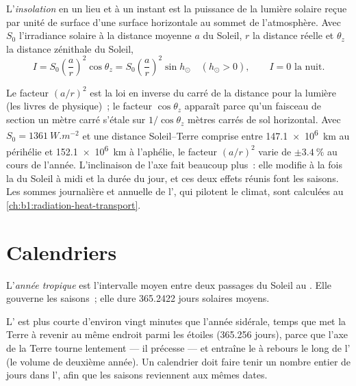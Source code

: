 \begin{definition}[Insolation]\label{def:b1:spherical-astronomy:insolation}
L'\emph{insolation} en un lieu et à un instant est la
puissance de la lumière solaire reçue par unité de surface d'une surface
horizontale au sommet de l'atmosphère. Avec $S_0$ l'irradiance solaire à la
distance moyenne $a$ du Soleil, $r$ la distance réelle et $\theta_z$ la
distance zénithale du Soleil,
\[
  I = S_0\left(\frac{a}{r}\right)^{2}\cos\theta_z = S_0\left(\frac{a}{r}\right)^{2}\sin h_\odot
  \quad (h_\odot > 0), \qquad I = 0 \text{ la nuit}.
\]
\end{definition}

Le facteur $(a/r)^2$ est la loi en inverse du carré de la distance pour la
lumière (les livres de physique)~; le facteur $\cos\theta_z$ apparaît parce
qu'un faisceau de section un mètre carré s'étale sur $1/\cos\theta_z$ mètres
carrés de sol horizontal. Avec
$S_0 = \qty{1361}{W.m^{-2}}$ et une distance Soleil--Terre comprise entre
\qty{147.1e6}{km} au périhélie et \qty{152.1e6}{km} à l'aphélie, le facteur
$(a/r)^2$ varie de $\pm\qty{3.4}{\percent}$ au cours de l'année. L'inclinaison
de l'axe fait beaucoup plus~: elle modifie à la fois la  du Soleil à
midi et la durée du jour, et ces deux effets réunis font les saisons. Les
sommes journalière et annuelle de l', qui pilotent le climat, sont
calculées au \cref{ch:b1:radiation-heat-transport}.


\section{Calendriers}

\begin{definition}\label{def:b1:spherical-astronomy:tropical-year}
L'\emph{année tropique} est l'intervalle moyen entre deux passages du Soleil
au . Elle gouverne les saisons~; elle dure 365.2422 jours solaires
moyens.
\end{definition}

L' est plus courte d'environ vingt minutes que l'année sidérale,
temps que met la Terre à revenir au même endroit parmi les étoiles
(365.256 jours), parce que l'axe de la Terre tourne lentement --- il
précesse --- et entraîne le  à rebours le long de l' (le
volume de deuxième année). Un calendrier doit faire tenir un nombre entier de
jours dans l', afin que les saisons reviennent aux mêmes dates.

